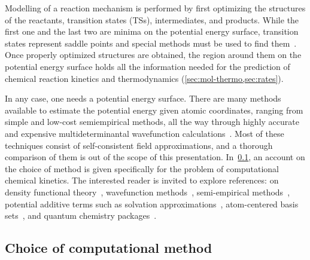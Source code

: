 Modelling of a reaction mechanism is performed by first optimizing the structures of the reactants,
transition states (TSs),
intermediates,
and products.
While the first one and the last two are minima on the potential energy surface,
transition states represent saddle points and special methods must be used to find them~\cite{Banerjee_1985,Schlegel_1987,Peng_1993,Peng_1996,Henkelman_2000a,Henkelman_2000b,Henkelman_2002,Mauro_2005,Sheppard_2008,Zimmerman_2013a,Zimmerman_2013b,Zimmerman_2015,Jafari_2017}.
Once properly optimized structures are obtained,
the region around them on the potential energy surface holds all the information needed for the prediction of chemical reaction kinetics and thermodynamics (\cref{sec:mol-thermo,sec:rates}).

In any case,
one needs a potential energy surface.
There are many methods available to estimate the potential energy given atomic coordinates,
ranging from simple and low-cost semiempirical methods,
all the way through highly accurate and expensive multideterminantal wavefunction calculations~\cite{Perdew_2001}.
Most of these techniques consist of self-consistent field approximations,
and a thorough comparison of them is out of the scope of this presentation.
In~\cref{sec:choice-of-method},
an account on the choice of method is given specifically for the problem of computational chemical kinetics.
The interested reader is invited to explore references:
on density functional theory~\cite{Hohenberg_1964,Kohn_1965,Perdew_1996,Perdew_1997,Ernzerhof_1999,Adamo_1999,Chai_2008a,Chai_2008b,Goerigk_2011,Arago_2011,Salzner_2011,Burns_2011,Minenkov_2012,Perdew_2014,Kryachko_2014,Yu_2016,DFT2016_poll},
wavefunction methods~\cite{Szabo_1996,Riplinger_2013,Riplinger_2016},
semi-empirical methods~\cite{MOPAC,Bannwarth_2020},
potential additive terms such
as solvation approximations~\cite{Marenich_2009,Marenich_2012},
atom-centered basis sets~\cite{Ditchfield_1971,Hehre_1972,Hariharan_1973,Hariharan_1974,Gordon_1980,Francl_1982,Clark_1983,Frisch_1984,Binning_1990,Szabo_1996,Helgaker_1997,Blaudeau_1997,Rassolov_1998,Rassolov_2001,Jensen_2012,Hill_2012},
and quantum chemistry packages~\cite{g09,Neese_2017}.

\subsection{Choice of computational method}%
\label{sec:choice-of-method}

